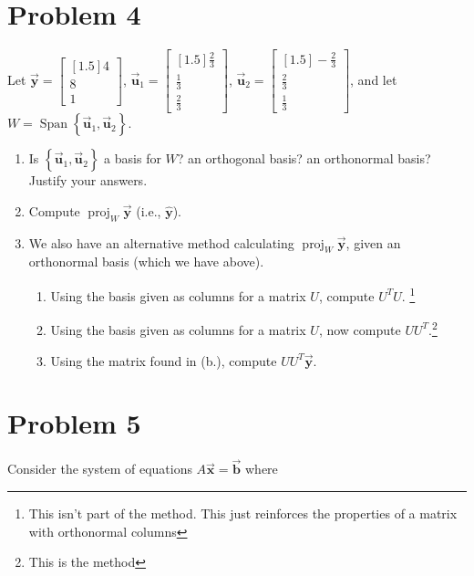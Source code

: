 \documentclass[letter,11pt]{article}
\theoremstyle{definition}
\begin{document}
\section{Problem 4}
Let $\vec{\boldsymbol{y}}=\begin{bmatrix}[1.5] 4 \\ 8 \\ 1 \end{bmatrix}$, $\vec{\boldsymbol{u}}_{1}=\begin{bmatrix}[1.5] \frac{2}{3} \\ \frac{1}{3} \\ \frac{2}{3} \end{bmatrix}$, $\vec{\boldsymbol{u}}_{2}=\begin{bmatrix}[1.5] -\frac{2}{3} \\ \frac{2}{3} \\ \frac{1}{3} \end{bmatrix}$, and let $W=\operatorname{Span}\left\{ \vec{\boldsymbol{u}}_{1}, \vec{\boldsymbol{u}}_{2} \right\}$.

\begin{enumerate}[label = \roman*.]
    \item Is $\left\{\vec{\boldsymbol{u}}_{1}, \vec{\boldsymbol{u}}_{2}\right\}$ a basis for $W$? an orthogonal basis? an orthonormal basis? Justify your answers.
    \item Compute $\operatorname{proj}_{W} \vec{\boldsymbol{y}}$ (i.e., $\hat{\boldsymbol{y}}$).
    \item We also have an alternative method calculating $\operatorname{proj}_{W} \vec{\boldsymbol{y}}$, given an orthonormal basis (which we have above).
    \begin{enumerate}[label = (\alph*.)]
        \item Using the basis given as columns for a matrix $U$, compute $U^{T} U$. \footnote[2]{This isn't part of the method. This just reinforces the properties of a matrix with orthonormal columns}
        
        \item Using the basis given as columns for a matrix $U$, now compute $UU^{T}$.\footnote[5]{This is the method}
        
        \item Using the matrix found in (b.), compute $U U^{T} \vec{\boldsymbol{y}}$.
    \end{enumerate}
\end{enumerate}

\section{Problem 5}
Consider the system of equations $A \vec{\boldsymbol{x}}=\vec{\boldsymbol{b}}$ where
\end{document}
